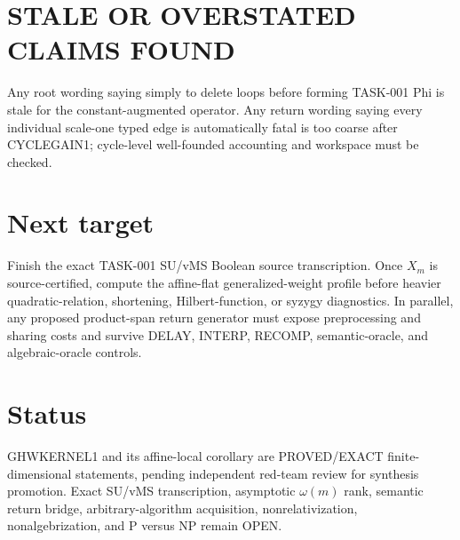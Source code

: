 \documentclass{article}
\begin{document}
\section*{STALE OR OVERSTATED CLAIMS FOUND}
Any root wording saying simply to delete loops before forming TASK-001 Phi is stale for the constant-augmented operator. Any return wording saying every individual scale-one typed edge is automatically fatal is too coarse after CYCLEGAIN1; cycle-level well-founded accounting and workspace must be checked.

\section*{Next target}
Finish the exact TASK-001 SU/vMS Boolean source transcription. Once \(X_m\) is source-certified, compute the affine-flat generalized-weight profile before heavier quadratic-relation, shortening, Hilbert-function, or syzygy diagnostics. In parallel, any proposed product-span return generator must expose preprocessing and sharing costs and survive DELAY, INTERP, RECOMP, semantic-oracle, and algebraic-oracle controls.

\section*{Status}
GHWKERNEL1 and its affine-local corollary are PROVED/EXACT finite-dimensional statements, pending independent red-team review for synthesis promotion. Exact SU/vMS transcription, asymptotic \(\omega(m)\) rank, semantic return bridge, arbitrary-algorithm acquisition, nonrelativization, nonalgebrization, and P versus NP remain OPEN.

\end{document}
